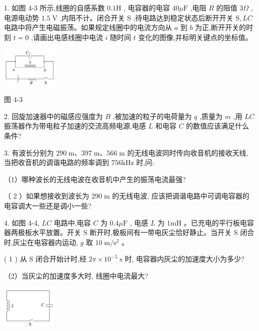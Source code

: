 \documentclass[10pt]{article}
\begin{document}
1. 如图 4-3 所示,线圈的自感系数 \({0.1}\mathrm{H}\) , 电容器的电容 \({40\mu }\mathrm{F}\) ,电阻 \(R\) 的阻值 \({3\Omega }\) ,电源电动势 \({1.5}\mathrm{\;V}\) ,内阻不计。闭合开关 \(\mathrm{S}\) ,待电路达到稳定状态后断开开关 \(\mathrm{S},{LC}\) 电路中将产生电磁振荡。如果规定线圈中的电流方向从 \(a\) 到 \(b\) 为正,断开开关的时刻 \(t = 0\) ,请画出电感线圈中电流 \(i\) 随时间 \(t\) 变化的图像,并标明关键点的坐标值。

\begin{center}
\includegraphics[max width=0.2\textwidth]{images/01910e72-c5b7-7ed5-a6d4-fb3a5faefc32_93_418919.jpg}
\end{center}

图 4-3

2. 回旋加速器中的磁感应强度为 \(B\) ,被加速的粒子的电荷量为 \(q\) ,质量为 \(m\) ,用 \({LC}\) 振荡器作为带电粒子加速的交流高频电源,电感 \(L\) 和电容 \(C\) 的数值应该满足什么条件?

3. 有波长分别为 \({290}\mathrm{\;m}\text{、}{397}\mathrm{\;m}\text{、}{566}\mathrm{\;m}\) 的无线电波同时传向收音机的接收天线, 当把收音机的调谐电路的频率调到 \({756}\mathrm{{kHz}}\) 时,问:

（1）哪种波长的无线电波在收音机中产生的振荡电流最强?

（ 2 ）如果想接收到波长为 \({290}\mathrm{\;m}\) 的无线电波, 应该把调谐电路中可调电容器的电容调大一些还是调小一些?

4. 如图 4-4, \({LC}\) 电路中,电容 \(C\) 为 \({0.4\mu }\mathrm{F}\) , 电感 \(L\) 为 \(1\mathrm{{mH}}\) 。已充电的平行板电容器两极板水平放置。开关 \(\mathrm{S}\) 断开时,极板间有一带电灰尘恰好静止。当开关 \(\mathrm{S}\) 闭合时,灰尘在电容器内运动, \(g\) 取 \({10}\mathrm{\;m}/{\mathrm{s}}^{2}\) 。

( 1 ) 从 \(\mathrm{S}\) 闭合开始计时,经 \({2\pi } \times {10}^{-5}\mathrm{\;s}\) 时, 电容器内灰尘的加速度大小为多少?

（2）当灰尘的加速度多大时, 线圈中电流最大?

\begin{center}
\includegraphics[max width=0.2\textwidth]{images/01910e72-c5b7-7ed5-a6d4-fb3a5faefc32_94_390650.jpg}
\end{center}
\end{document}

